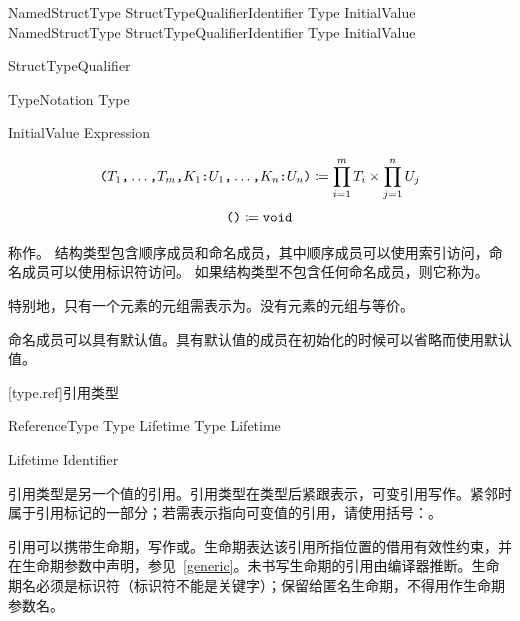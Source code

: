 \begin{bnf}{NamedStructType}
    StructTypeQualifier\bnfs Identifier \terminal{:} Type InitialValue\bnfq \br
    NamedStructType \terminal{,} StructTypeQualifier\bnfs Identifier \terminal{:} Type InitialValue\bnfq
\end{bnf}

\begin{bnf}{StructTypeQualifier}
\end{bnf}

\begin{bnf}{TypeNotation}
    \terminal{:} Type
\end{bnf}

\begin{bnf}{InitialValue}
    \terminal{=} Expression
\end{bnf}

$$ \texttt{(} T_1 \texttt{,} \ldots \texttt{,} T_m \texttt{,} K_1 \texttt{:} U_1 \texttt{,} \ldots \texttt{,} K_n \texttt{:} U_n \texttt{)} \coloneqq \prod^m_{i=1} T_i \times \prod^n_{j=1} U_j $$
$$ \texttt{()} \coloneqq \texttt{void} $$

\pnum
{}称作。
结构类型包含顺序成员和命名成员，其中顺序成员可以使用索引访问，命名成员可以使用标识符访问。
如果结构类型不包含任何命名成员，则它称为。

\pnum
特别地，只有一个元素的元组需表示为。没有元素的元组与等价。

\pnum
命名成员可以具有默认值。具有默认值的成员在初始化的时候可以省略而使用默认值。

[type.ref]{引用类型}

\begin{bnf}{ReferenceType}
    Type Lifetime\bnfq \terminal{\&} \br
    Type Lifetime\bnfq {} \terminal{\&}
\end{bnf}

\begin{bnf}{Lifetime}
     Identifier
\end{bnf}

\pnum
引用类型是另一个值的引用。引用类型在类型后紧跟\tcode{\&}表示，可变引用写作。紧邻\tcode{\&}时属于引用标记的一部分；若需表示指向可变值的引用，请使用括号：。

\pnum
引用可以携带生命期，写作或。生命期表达该引用所指位置的借用有效性约束，并在生命期参数中声明，参见~\ref{generic}。未书写生命期的引用由编译器推断。生命期名必须是标识符（标识符不能是关键字）；保留给匿名生命期，不得用作生命期参数名。

